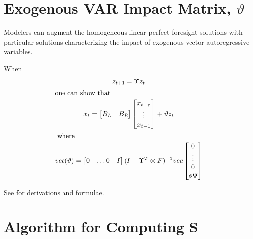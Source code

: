 \documentclass[12pt]{elsart}
\begin{document}
\section{Exogenous VAR Impact Matrix, $\vartheta{}$}

Modelers can augment the homogeneous linear perfect foresight solutions with
particular solutions characterizing  the impact of exogenous vector
autoregressive variables.

\begin{thrm}\label{var}
  

When 
\begin{gather}
  z_{t+1} = \Upsilon{} z_t\\ \intertext{one can show that}
 x_{t} = \begin{bmatrix}
B_L& B_R  
\end{bmatrix}
 \begin{bmatrix}
     x_{t-\tau}\\\vdots\\ x_{t-1}
  \end{bmatrix} + \vartheta{} z_t
\\
\intertext{ where }
vec(\vartheta{}) =   \begin{bmatrix}
  0&\dots 0&I
  \end{bmatrix}
 (I - \Upsilon^T\otimes{} F)^{-1} vec
\begin{bmatrix}
0\\ \vdots \\ 0 \\
\phi\Psi%
\end{bmatrix}
\end{gather}
\end{thrm}

See \cite{anderson10} for  derivations and formulae.



\section{Algorithm for Computing S}
\end{document}
